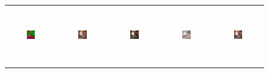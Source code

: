 \begin{figure}[]
\begin{tabular} {cc|cc|c}
\includegraphics[width=0.1932\textwidth,height=0.96in]{Images/Rec/ADE/label/ADE_val_00001243.png} & \includegraphics[width=0.1932\textwidth,height=0.96in]{Images/Rec/ADE/gt/ADE_val_00001243.jpg} &
\includegraphics[width=0.1932\textwidth,height=0.96in]{Images/Rec/ADE/pix2pixhd/ADE_val_00001243.jpg} &   \includegraphics[width=0.1932\textwidth,height=0.96in]{Images/Rec/ADE/spade/ADE_val_00001243.jpg} &  \includegraphics[width=0.1932\textwidth,height=0.96in]{Images/Rec/ADE/ours/ADE_val_00001243.png} \\



\end{tabular}
\end{figure}
